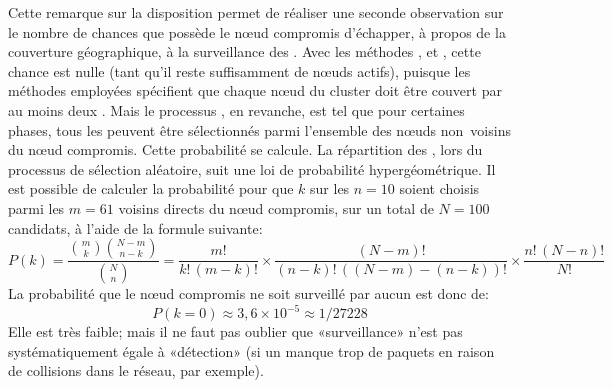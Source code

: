Cette remarque sur la disposition permet de réaliser une seconde observation sur le nombre de chances que possède le nœud compromis d'échapper, à propos de la couverture géographique, à la surveillance des \cns.
Avec les méthodes \ideres, \iddemx et \iddems, cette chance est nulle (tant qu'il reste suffisamment de nœuds actifs), puisque les méthodes employées spécifient que chaque nœud du cluster doit être couvert par au moins deux \cns.
Mais le processus \idrand, en revanche, est tel que pour certaines phases, tous les \cns peuvent être sélectionnés parmi l'ensemble des nœuds non~voisins du nœud compromis.
Cette probabilité se calcule.
La répartition des \cns, lors du processus de sélection aléatoire, suit une loi de probabilité hypergéométrique.
Il est possible de calculer la probabilité pour que $k$ \cns sur les $n=10$ soient choisis parmi les $m=61$ voisins directs du nœud compromis, sur un total de $N=100$ candidats, à l'aide de la formule suivante:
$$P(k) = \frac{{m\choose k}{N-m\choose n-k}}{{N\choose n}}=
\frac{m!}{k!\,(m-k)!}\times\frac{(N-m)!}{(n-k)!\,((N-m)-(n-k))!}\times\frac{n!\,(N-n)!}{N!}$$
La probabilité que le nœud compromis ne soit surveillé par aucun \cn est donc de:
$$P(k=0)\approx3,6\times10^{-5}\approx1/27228$$
Elle est très faible; mais il ne faut pas oublier que «surveillance» n'est pas systématiquement égale à «détection» (si un \cn manque trop de paquets en raison de collisions dans le réseau, par exemple).

